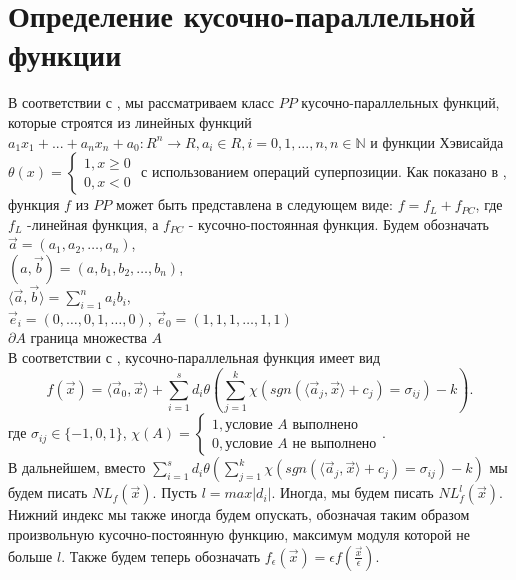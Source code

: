 \documentclass[main.tex]{subfiles}
\begin{document}
\section{Определение кусочно-параллельной \\ функции}
В соответствии с \cite{Polov4}, мы рассматриваем класс
$PP$
кусочно-параллельных функций, которые строятся из линейных функций \\
$a_1 x_1+...+a_n x_n+a_0: R^n \to R, a_i\in R, i=0,1,...,n, n\in \mathbb{N}$
и функции Хэвисайда \\
$\theta(x) = \begin{cases} 1, x \geq 0 \\ 0, x< 0 \end{cases}$
с использованием операций суперпозиции.
Как показано в \cite{Polov4}, функция
$f$ из $PP$ может быть представлена в следующем виде:
$f = f_L + f_{PC}$,
где $f_L$ -линейная функция, а
$f_{PC}$ - кусочно-постоянная функция.
Будем обозначать
$\vec{a} = (a_1, a_2, \ldots, a_n)$, \\
$(a, \vec{b}) = (a, b_1, b_2, \ldots, b_n)$,\\
$\langle \vec{a}, \vec{b} \rangle =  \sum_{i = 1}^{n} a_i b_i$,\\
$\vec{e}_i = (0, \ldots, 0, 1, \ldots, 0)$, $\vec{e}_0 = (1, 1, 1, \ldots, 1, 1)$\\
$\partial A$ граница множества $A$\\
В соответствии с \cite{Polov1}, кусочно-параллельная функция имеет вид
\begin{equation}
  f(\vec{x}) = \langle \vec{a}_0, \vec{x} \rangle + \sum_{i = 1}^{s} d_i \theta(\sum_{j = 1}^{k} \chi(sgn(\langle \vec{a}_j, \vec{x} \rangle + c_j) = \sigma_{ij}) - k).
\end{equation}
где
$\sigma_{ij} \in \{-1, 0, 1\}$,
$\chi(A)=\begin{cases} 1, \mbox{условие } A \mbox{ выполнено} \\ 0, \mbox{условие } A \mbox{ не выполнено}  \end{cases}$.\\
В дальнейшем, вместо
$\sum_{i = 1}^{s} d_i \theta(\sum_{j = 1}^{k} \chi(sgn(\langle \vec{a}_j, \vec{x} \rangle + c_j) = \sigma_{ij}) - k)$
мы будем писать
$NL_f(\vec{x})$.
Пусть $l = max |d_i|$.
Иногда, мы будем писать
$NL_{f}^{l}(\vec{x})$.
Нижний индекс мы также иногда будем опускать, обозначая таким образом произвольную кусочно-постоянную функцию,
максимум модуля которой не больше $l$.
Также будем теперь обозначать
$f_{\epsilon}( \vec{x}) =\epsilon f( \frac{\vec{x}}{\epsilon}).$
\end{document}
